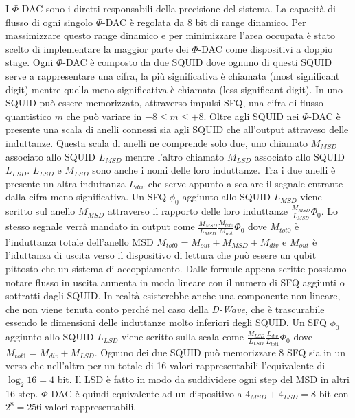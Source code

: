 I $\Phi$-DAC sono i diretti responsabili della precisione del sistema. La capacità di flusso di ogni singolo $\Phi$-DAC è regolata da 8 bit di range dinamico. Per massimizzare questo range dinamico e per minimizzare l'area occupata è stato scelto di implementare la maggior parte dei $\Phi$-DAC come dispositivi a doppio stage. Ogni $\Phi$-DAC è composto da due SQUID dove ognuno di questi SQUID serve a rappresentare una cifra, la più significativa è chiamata  (most significant digit) mentre quella meno significativa è chiamata  (less significant digit). In uno SQUID può essere memorizzato, attraverso impulsi SFQ, una cifra di flusso quantistico $m$ che può variare in $-8 \le m \le +8$. Oltre agli SQUID nei $\Phi$-DAC è presente una scala di anelli connessi sia agli SQUID che all'output attraveso delle induttanze. Questa scala di anelli ne comprende solo due, uno chiamato $M_{MSD}$ associato allo SQUID $L_{MSD}$ mentre l'altro chiamato $M_{LSD}$ associato allo SQUID $L_{LSD}$. $L_{LSD}$ e $M_{LSD}$ sono anche i nomi delle loro induttanze.
Tra i due anelli è presente un altra induttanza $L_{div}$ che serve appunto a scalare il segnale entrante dalla cifra meno significativa. Un SFQ $\phi_0$ aggiunto allo SQUID $L_{MSD}$ viene scritto sul anello $M_{MSD}$ attraverso il rapporto delle loro induttanze $\frac{M_{MSD}}{L_{MSD}}\Phi_0$.
Lo stesso segnale verrà mandato in output come $\frac{M_{MSD}}{L_{MSD}}\frac{M_{tot0}}{M_{out}}\Phi_0$ dove $M_{tot0}$ è l'induttanza totale dell'anello MSD $M_{tot0} = M_{out} + M_{MSD} + M_{div}$ e $M_{out}$ è l'iduttanza di uscita verso il dispositivo di lettura che può essere un qubit pittosto che un sistema di accoppiamento. Dalle formule appena scritte possiamo notare flusso in uscita aumenta in modo lineare con il numero di SFQ aggiunti o sottratti dagli SQUID. In realtà esisterebbe anche una componente non lineare, che non viene tenuta conto perché nel caso della \textit{D-Wave}, che è trascurabile essendo le dimensioni delle induttanze molto inferiori degli SQUID.
Un SFQ $\phi_0$ aggiunto allo SQUID $L_{LSD}$ viene scritto sulla scala come $\frac{M_{LSD}}{L_{LSD}}\frac{L_{div}}{L_{tot1}}\Phi_0$ dove $M_{tot1} = M_{div} + M_{LSD}$. Ognuno dei due SQUID può memorizzare 8 SFQ sia in un verso che nell'altro per un totale di 16 valori rappresentabili l'equivalente di $\log_2{16} = 4$ bit. Il LSD è fatto in modo da suddividere ogni step del MSD in altri 16 step. $\Phi$-DAC è quindi equivalente ad un dispositivo a $4_{MSD} + 4_{LSD} = 8$ bit con $2^8 = 256$ valori rappresentabili.
